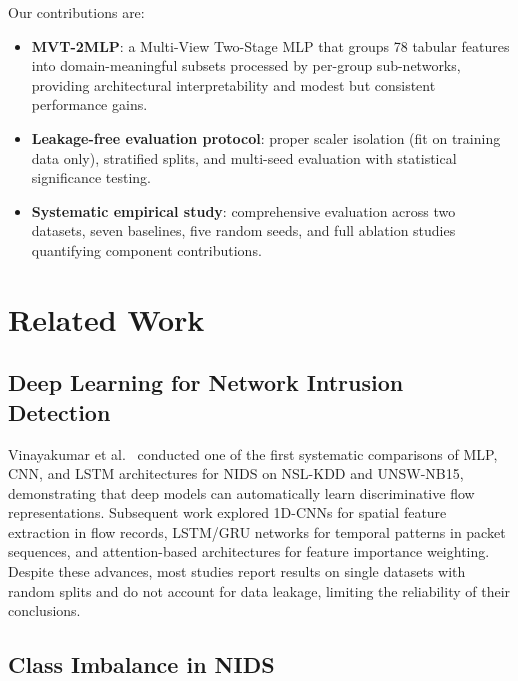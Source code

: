 \documentclass[12pt]{article}
\begin{document}
Our contributions are:
\begin{itemize}
    \item \textbf{MVT-2MLP}: a Multi-View Two-Stage MLP that groups 78 tabular features into domain-meaningful subsets processed by per-group sub-networks, providing architectural interpretability and modest but consistent performance gains.
    \item \textbf{Leakage-free evaluation protocol}: proper scaler isolation (fit on training data only), stratified splits, and multi-seed evaluation with statistical significance testing.
    \item \textbf{Systematic empirical study}: comprehensive evaluation across two datasets, seven baselines, five random seeds, and full ablation studies quantifying component contributions.
\end{itemize}

\section{Related Work}
\label{sec:related}


\subsection{Deep Learning for Network Intrusion Detection}
\label{subsec:dl_nids}

Vinayakumar et al.~\cite{vinayakumar2019deep} conducted one of the first systematic comparisons of MLP, CNN, and LSTM architectures for NIDS on NSL-KDD and UNSW-NB15, demonstrating that deep models can automatically learn discriminative flow representations. Subsequent work explored 1D-CNNs for spatial feature extraction in flow records, LSTM/GRU networks for temporal patterns in packet sequences, and attention-based architectures for feature importance weighting. Despite these advances, most studies report results on single datasets with random splits and do not account for data leakage, limiting the reliability of their conclusions.

\subsection{Class Imbalance in NIDS}
\label{subsec:imbalance}
\end{document}

